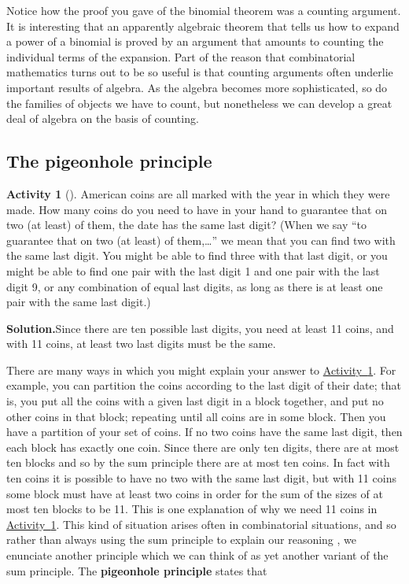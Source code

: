 \documentclass[10pt,]{book}
\newcommand{\terminology}[1]{\textbf{#1}}
\theoremstyle{plain}
\theoremstyle{definition}
\newtheorem{activity}[project]{Activity}
\numberwithin{equation}{chapter}
\begin{document}
Notice how the proof you gave of the binomial theorem was a counting argument. It is interesting that an apparently algebraic theorem that tells us how to expand a power of a binomial is proved by an argument that amounts to counting the individual terms of the expansion. Part of the reason that combinatorial mathematics turns out to be so useful is that counting arguments often underlie important results of algebra. As the algebra becomes more sophisticated, so do the families of objects we have to count, but nonetheless we can develop a great deal of algebra on the basis of counting.%
\typeout{************************************************}
\typeout{************************************************}
\subsection[{The pigeonhole principle}]{The pigeonhole principle}\label{subsection-3}
\begin{activity}[]\label{elevencoins}
American coins are all marked with the year in which they were made. How many coins do you need to have in your hand to guarantee that on two (at least) of them, the date has the same last digit? (When we say ``to guarantee that on two (at least) of them,\dots{}'' we mean that you can find two with the same last digit. You might be able to find three with that last digit, or you might be able to find one pair with the last digit 1 and one pair with the last digit 9, or any combination of equal last digits, as long as there is at least one pair with the same last digit.)%
\par\medskip\noindent%
\textbf{Solution.}\quad Since there are ten possible last digits, you need at least 11 coins, and with 11 coins, at least two last digits must be the same.%
\end{activity}
There are many ways in which you might explain your answer to \hyperref[elevencoins]{Activity~\ref{elevencoins}}. For example, you can partition the coins according to the last digit of their date; that is, you put all the coins with a given last digit in a block together, and put no other coins in that block; repeating until all coins are in some block. Then you have a partition of your set of coins. If no two coins have the same last digit, then each block has exactly one coin. Since there are only ten digits, there are at most ten blocks and so by the sum principle there are at most ten coins. In fact with ten coins it is possible to have no two with the same last digit, but with 11 coins some block must have at least two coins in order for the sum of the sizes of at most ten blocks to be 11. This is one explanation of why we need 11 coins in \hyperref[elevencoins]{Activity~\ref{elevencoins}}. This kind of situation arises often in combinatorial situations, and so rather than always using the sum principle to explain our reasoning , we enunciate another principle which we can think of as yet another variant of the sum principle. The \terminology{pigeonhole principle} states that%
\end{document}
